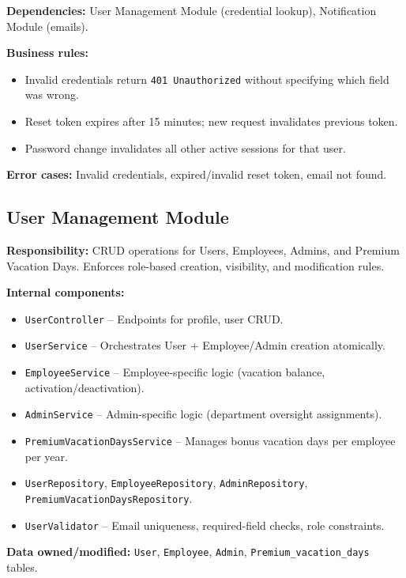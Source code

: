 \documentclass[11pt,a4paper]{article}
\begin{document}
\textbf{Dependencies:} User Management Module (credential lookup), Notification Module (emails).

\textbf{Business rules:}
\begin{itemize}[leftmargin=1.5em]
    \item Invalid credentials return \texttt{401 Unauthorized} without specifying which field was wrong.
    \item Reset token expires after 15 minutes; new request invalidates previous token.
    \item Password change invalidates all other active sessions for that user.
\end{itemize}

\textbf{Error cases:} Invalid credentials, expired/invalid reset token, email not found.

\subsection{User Management Module}

\textbf{Responsibility:} CRUD operations for Users, Employees, Admins, and Premium Vacation Days. Enforces role-based creation, visibility, and modification rules.

\textbf{Internal components:}
\begin{itemize}[leftmargin=1.5em]
    \item \texttt{UserController} -- Endpoints for profile, user CRUD.
    \item \texttt{UserService} -- Orchestrates User + Employee/Admin creation atomically.
    \item \texttt{EmployeeService} -- Employee-specific logic (vacation balance, activation/deactivation).
    \item \texttt{AdminService} -- Admin-specific logic (department oversight assignments).
    \item \texttt{PremiumVacationDaysService} -- Manages bonus vacation days per employee per year.
    \item \texttt{UserRepository}, \texttt{EmployeeRepository}, \texttt{AdminRepository}, \texttt{PremiumVacationDaysRepository}.
    \item \texttt{UserValidator} -- Email uniqueness, required-field checks, role constraints.
\end{itemize}

\textbf{Data owned/modified:} \texttt{User}, \texttt{Employee}, \texttt{Admin}, \texttt{Premium\_vacation\_days} tables.
\end{document}
